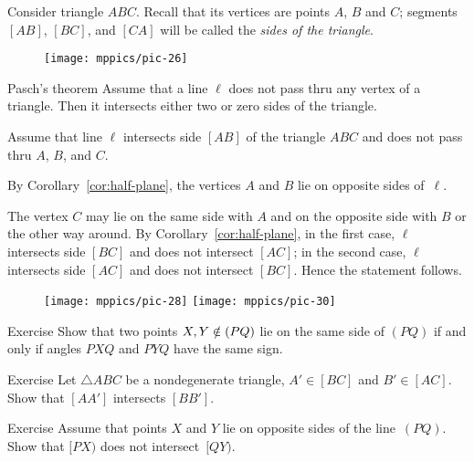 Consider triangle $ABC$.
Recall that its vertices are points $A$, $B$ and $C$;
segments $[AB]$, $[BC]$, and $[CA]$ will be called the \emph{sides of the triangle}.

{

\begin{wrapfigure}{r}{27mm}
\vskip-4mm
\centering
\texttt{[image: mppics/pic-26]}
\end{wrapfigure}

\begin{thm}[\abs]{Pasch's theorem}\label{thm:pasch}
Assume that a line $\ell$ does not pass thru any vertex of a triangle.
Then it intersects either two or zero sides of the triangle.
\end{thm}

Assume that line $\ell$ intersects side $[AB]$ of the triangle $ABC$ and does not pass thru $A$, $B$, and $C$.

By Corollary~\ref{cor:half-plane}, the vertices $A$ and $B$ lie on opposite sides of~$\ell$.

}

The vertex $C$ may lie on the same side with $A$ and on the opposite side with $B$ or the other way around.
By Corollary~\ref{cor:half-plane}, in the first case, $\ell$ intersects side $[BC]$ and does not intersect $[AC]$; in the second case, $\ell$ intersects side $[AC]$ and does not intersect $[BC]$.
Hence the statement follows.
\qeds

{

\begin{wrapfigure}[5]{r}{29mm}
\vskip-4mm
\centering
\texttt{[image: mppics/pic-28]}
\bigskip
\texttt{[image: mppics/pic-30]}
\end{wrapfigure}

\begin{thm}{Exercise}\label{ex:signs-PXQ-PYQ}
Show that two points $X,Y\notin(PQ)$ lie on the same side of $(PQ)$
if and only if angles $PXQ$ and $PYQ$ have the same sign.
\end{thm}

\begin{thm}{Exercise}\label{ex:chevinas}
Let $\triangle ABC$ be a nondegenerate triangle,
$A'\in[BC]$  and 
$B'\in [AC]$.
Show that $[AA']$ intersects $[BB']$.
\end{thm}

\begin{thm}{Exercise}\label{ex:Z}
Assume that points $X$ and $Y$ lie on opposite sides of the line~$(PQ)$.
Show that $[PX)$ does not intersect~$[QY)$. 
\end{thm}

}

